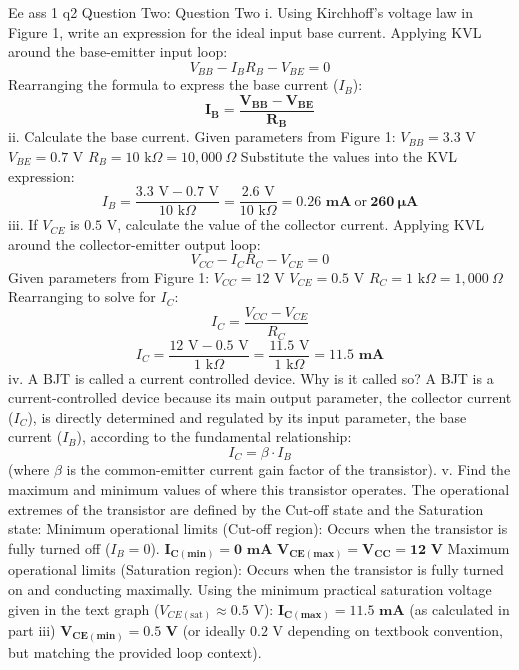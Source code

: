 Ee ass 1 q2 Question Two:
Question Two
i. Using Kirchhoff's voltage law in Figure 1, write an expression for the ideal input base current.
Applying KVL around the base-emitter input loop:
$$V_{BB} - I_B R_B - V_{BE} = 0$$ 
Rearranging the formula to express the base current ($I_B$):
$$\mathbf{I_B = \frac{V_{BB} - V_{BE}}{R_B}}$$ 
ii. Calculate the base current.
Given parameters from Figure 1:
$V_{BB} = 3.3\text{ V}$
$V_{BE} = 0.7\text{ V}$
$R_B = 10\text{ k}\Omega = 10,000\ \Omega$
Substitute the values into the KVL expression:
$$I_B = \frac{3.3\text{ V} - 0.7\text{ V}}{10\text{ k}\Omega} = \frac{2.6\text{ V}}{10\text{ k}\Omega} = \mathbf{0.26\text{ mA}}\ \text{or}\ \mathbf{260\ \mu\text{A}}$$ 
iii. If $V_{CE}$ is $0.5\text{ V}$, calculate the value of the collector current.
Applying KVL around the collector-emitter output loop:
$$V_{CC} - I_C R_C - V_{CE} = 0$$ 
Given parameters from Figure 1:
$V_{CC} = 12\text{ V}$
$V_{CE} = 0.5\text{ V}$
$R_C = 1\text{ k}\Omega = 1,000\ \Omega$
Rearranging to solve for $I_C$:
$$I_C = \frac{V_{CC} - V_{CE}}{R_C}$$ 
$$I_C = \frac{12\text{ V} - 0.5\text{ V}}{1\text{ k}\Omega} = \frac{11.5\text{ V}}{1\text{ k}\Omega} = \mathbf{11.5\text{ mA}}$$ 
iv. A BJT is called a current controlled device. Why is it called so?
A BJT is a current-controlled device because its main output parameter, the collector current ($I_C$), is directly determined and regulated by its input parameter, the base current ($I_B$), according to the fundamental relationship:
$$I_C = \beta \cdot I_B$$ 
(where $\beta$ is the common-emitter current gain factor of the transistor).
v. Find the maximum and minimum values of where this transistor operates.
The operational extremes of the transistor are defined by the Cut-off state and the Saturation state:
Minimum operational limits (Cut-off region):
Occurs when the transistor is fully turned off ($I_B = 0$).
$\mathbf{I_{C(\text{min})} = 0\text{ mA}}$
$\mathbf{V_{CE(\text{max})} = V_{CC} = 12\text{ V}}$
Maximum operational limits (Saturation region):
Occurs when the transistor is fully turned on and conducting maximally. Using the minimum practical saturation voltage given in the text graph ($V_{CE(\text{sat})} \approx 0.5\text{ V}$):
$\mathbf{I_{C(\text{max})} = 11.5\text{ mA}}$ (as calculated in part iii)
$\mathbf{V_{CE(\text{min})} = 0.5\text{ V}}$ (or ideally $0.2\text{ V}$ depending on textbook convention, but matching the provided loop context).
